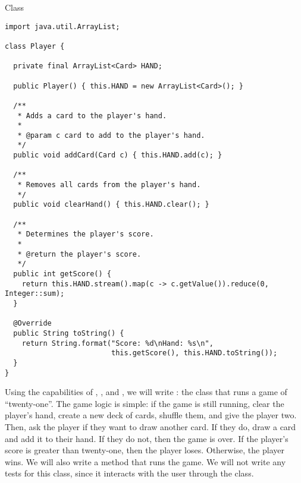 \begin{cl}{ Class}
\begin{lstlisting}[language=MyJava]
import java.util.ArrayList;

class Player {

  private final ArrayList<Card> HAND;

  public Player() { this.HAND = new ArrayList<Card>(); }

  /**
   * Adds a card to the player's hand.
   *
   * @param c card to add to the player's hand.
   */
  public void addCard(Card c) { this.HAND.add(c); }

  /**
   * Removes all cards from the player's hand.
   */
  public void clearHand() { this.HAND.clear(); }

  /**
   * Determines the player's score.
   *
   * @return the player's score.
   */
  public int getScore() {
    return this.HAND.stream().map(c -> c.getValue()).reduce(0, Integer::sum);
  }

  @Override
  public String toString() {
    return String.format("Score: %d\nHand: %s\n", 
                         this.getScore(), this.HAND.toString());
  }
}
\end{lstlisting}
\end{cl}

Using the capabilities of , , and , we will write : the class that runs a game of ``twenty-one''. The game logic is simple: if the game is still running, clear the player's hand, create a new deck of cards, shuffle them, and give the player two. Then, ask the player if they want to draw another card. If they do, draw a card and add it to their hand. If they do not, then the game is over. If the player's score is greater than twenty-one, then the player loses. Otherwise, the player wins. We will also write a  method that runs the game. We will not write any tests for this class, since it interacts with the user through the  class.

